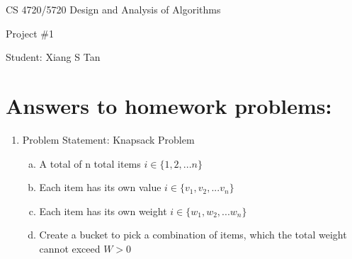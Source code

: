 \documentclass[11pt]{article}
\begin{document}
 

\rhead{\today}

\begin{center}\begin{Large}
CS 4720/5720 Design and Analysis of Algorithms

Project \#1

Student: Xiang S Tan
\end{Large}
\end{center}


\section*{Answers to homework problems:}

\begin{enumerate}
	\item Problem Statement: Knapsack Problem
		\begin{enumerate}[(a)]
		\item A total of n total items $i \in \{1, 2, ... n\}$
		\item Each item has its own value $i \in \{v_1, v_2, ... v_n\}$
		\item Each item has its own weight $i \in \{w_1, w_2, ... w_n\}$
		\item Create a bucket to pick a combination of items, which the total weight cannot exceed $W>0$
		\end{enumerate}
		

\end{enumerate}
\end{document}
